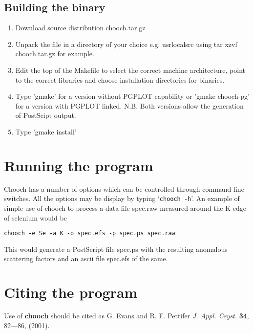 \documentclass[a4paper]{article}
\begin{document}
\subsection*{Building the binary}

\begin{enumerate}
\item Download source distribution chooch.tar.gz
\item Unpack the file in a directory of your choice
e.g. \/usr\/local\/src using tar xzvf chooch.tar.gz for example.
\item Edit the top of the Makefile to select the correct machine
architecture, point to the correct libraries and choose installation
directories for binaries.
\item Type 'gmake' for a version without PGPLOT capability or 'gmake
chooch-pg' for a version with PGPLOT linked. N.B. Both versions allow
the generation of PostScipt output.
\item Type 'gmake install'
\end{enumerate}

\section*{Running the program}

Chooch has a number of options which can be controlled through command
line switches.  All the options may be display by typing `{\tt chooch
-h}'. An example of simple use of chooch to process a data file
spec.raw measured around the K edge of selenium would be
\begin{verbatim}
chooch -e Se -a K -o spec.efs -p spec.ps spec.raw
\end{verbatim}
This would generate a PostScript file spec.ps with the resulting
anomalous scattering factors and an ascii file spec.efs of the same.

\section*{Citing the program}

Use of {\bf chooch} should be cited as G. Evans and R. F. Pettifer
{\it J. Appl. Cryst.} {\bf 34}, 82---86, (2001).
\end{document}
